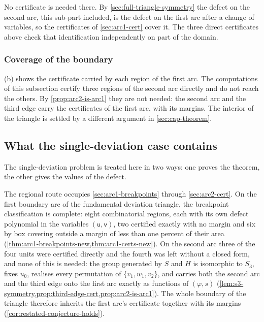 \documentclass[11pt,reqno]{amsart}
\renewcommand{\_}{\origunderscore\allowbreak}
\numberwithin{equation}{section}
\theoremstyle{plain}
\theoremstyle{definition}
\theoremstyle{remark}
\newcommand{\tilt}{\varphi}                  %
\newcommand{\arcp}{s}                        %
\newcommand{\base}{u}                        %
\begin{document}
No certificate is needed there. By \cref{sec:full-triangle-symmetry}
the defect on the second arc, this sub-part included, is the defect on
the first arc after a change of variables, so the certificates of
\cref{sec:arc1-cert} cover it. The three direct certificates above check
that identification independently on part of the domain.

\subsubsection{Coverage of the boundary}\label{sec:arc2-coverage}

(b) shows the certificate carried by each
region of the first arc. The computations of this subsection certify
three regions of the second arc directly and do not reach the others. By
\cref{prop:arc2-is-arc1} they are not needed: the second arc and the
third edge carry the certificates of the first arc, with its margins.
The interior of the triangle is settled by a different argument in
\cref{sec:cap-theorem}.

\subsection{What the single-deviation case contains}\label{sec:deviation-scope-summary}

The single-deviation problem is treated here in two ways: one proves the
theorem, the other gives the values of the defect.

The regional route occupies \cref{sec:arc1-breakpoints} through
\cref{sec:arc2-cert}. On the first boundary arc of the fundamental
deviation triangle, the breakpoint classification is complete: eight
combinatorial regions, each with its own defect polynomial in the
variables $(\mathsf u,\mathsf v)$, two certified exactly with no margin
and six by box covering outside a margin of less than one percent of
their area (\cref{thm:arc1-breakpoints-new,thm:arc1-certs-new}). On the
second arc three of the four units were certified directly and the
fourth was left without a closed form, and none of this is needed: the
group generated by $S$ and $H$ is isomorphic to $S_3$,
fixes $\base_0$, realises every permutation of $\{v_1,w_1,v_2\}$, and
carries both the second arc and the third edge onto the first arc
exactly as functions of $(\tilt,\arcp)$
(\cref{lem:s3-symmetry,prop:third-edge-cert,prop:arc2-is-arc1}). The
whole boundary of the triangle therefore inherits the first arc's
certificate together with its margins
(\cref{cor:restated-conjecture-holds}).
\end{document}
